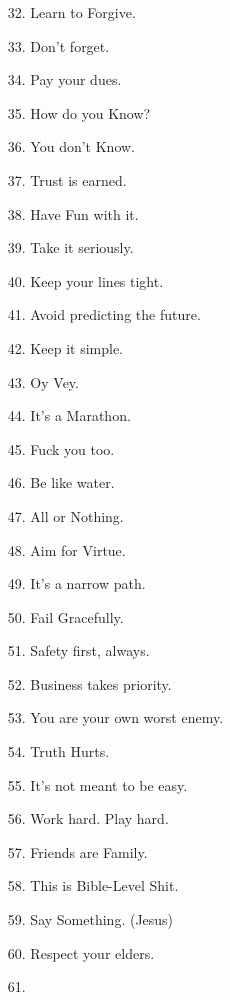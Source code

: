 \documentclass[11pt]{article}
\begin{document}
\begin{enumerate}
	\item[32.] Learn to Forgive.
	\item[33.] Don't forget.
	\item[34.] Pay your dues.
	\item[35.] How do you Know?
	\item[36.] You don't Know.
	\item[37.] Trust is earned.
	\item[38.] Have Fun with it.
	\item[39.] Take it seriously.
	\item[40.] Keep your lines tight.
	\item[41.] Avoid predicting the future.
	\item[42.] Keep it simple.
	\item[43.] Oy Vey.
	\item[44.] It's a Marathon.
	\item[45.] Fuck you too.
	\item[46.] Be like water.
	\item[47.] All or Nothing.
	\item[48.] Aim for Virtue.
	\item[49.] It's a narrow path.
	\item[50.] Fail Gracefully.
	\item[51.] Safety first, always.
	\item[52.] Business takes priority.
	\item[53.] You are your own worst enemy.
	\item[54.] Truth Hurts.
	\item[55.] It's not meant to be easy.
	\item[56.] Work hard. Play hard.
	\item[57.] Friends are Family.
	\item[58.] This is Bible-Level Shit.
	\item[59.] Say Something. (Jesus)
	\item[60.] Respect your elders.
	\item[61.] 
\end{enumerate}
\end{document}
